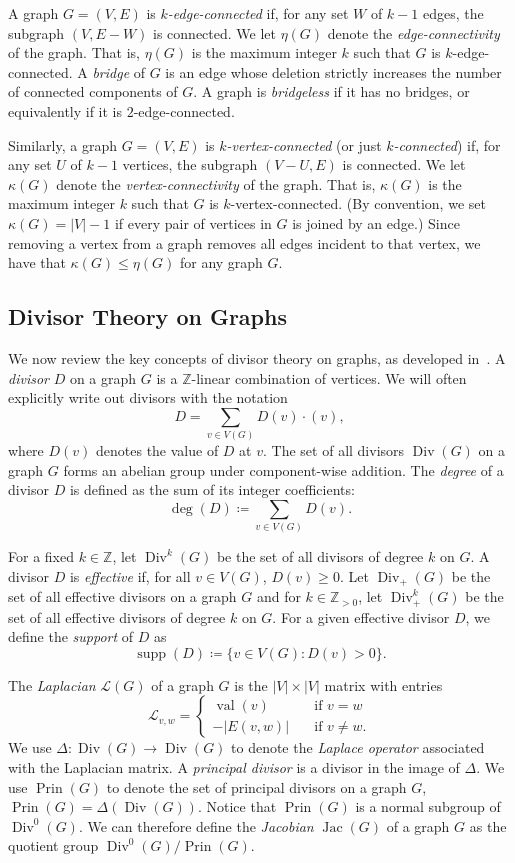\documentclass[ALCO,ThmDefs,Unicode,epreuves]{cedram}
\DeclareMathOperator{\val}{val}
\DeclareMathOperator{\Div}{Div}
\DeclareMathOperator{\supp}{supp}
\DeclareMathOperator{\Prin}{Prin}
\DeclareMathOperator{\Jac}{Jac}
\begin{document}
A graph $G = (V, E)$ is \emph{$k$-edge-connected} if, for any set $W$ of $k-1$ edges, the subgraph $(V,E-W)$ is connected. We let $\eta(G)$ denote the \emph{edge-connectivity} of the graph. That is, $\eta(G)$ is the maximum integer $k$ such that $G$ is $k$-edge-connected. A \emph{bridge} of $G$ is an edge whose deletion strictly increases the number of connected components of $G$. A graph is \emph{bridgeless} if it has no bridges, or equivalently if it is $2$-edge-connected.

Similarly, a graph $G = (V, E)$ is \emph{$k$-vertex-connected} (or just \emph{$k$-connected}) if, for any set $U$ of $k-1$ vertices, the subgraph $(V-U,E)$ is connected. We let $\kappa(G)$ denote the \emph{vertex-connectivity} of the graph. That is, $\kappa(G)$ is the maximum integer $k$ such that $G$ is $k$-vertex-connected. (By convention, we set $\kappa(G)=|V|-1$ if every pair of vertices in $G$ is joined by an edge.) Since removing a vertex from a graph removes all edges incident to that vertex, we have that $\kappa(G)\leq \eta(G)$ for any graph $G$.

\subsection{Divisor Theory on Graphs}

We now review the key concepts of divisor theory on graphs, as developed in~\cite{baker}. A \emph{divisor} $D$ on a graph $G$ is a $\mathbb{Z}$-linear combination of vertices. We will often explicitly write out divisors with the notation
\[
D = \sum_{v \in V(G)} D(v) \cdot (v),
\]
where $D(v)$ denotes the value of $D$ at $v$.
The set of all divisors $\Div (G)$ on a graph $G$ forms an abelian group under component-wise addition. The \emph{degree} of a divisor $D$ is defined as the sum of its integer coefficients:
\[
\deg (D) \coloneqq \sum_{v \in V(G)} D(v).
\]

For a fixed $k \in \mathbb{Z}$, let $\Div ^k(G)$ be the set of all divisors of degree $k$ on $G$. A divisor $D$ is \emph{effective} if, for all $v \in V(G)$, $D(v) \geq 0$. Let $\Div _+(G)$ be the set of all effective divisors on a graph $G$ and for $k \in \mathbb{Z}_{>0}$, let $\Div _+^k(G)$ be the set of all effective divisors of degree $k$ on $G$. For a given effective divisor $D$, we define the \emph{support} of $D$ as
\[
\supp (D) \coloneqq \{ v \in V(G) : D(v) > 0 \}.
\]

The \emph{Laplacian} $\mathcal{L}(G)$ of a graph $G$ is the $|V|\times |V|$ matrix with entries
\[
\mathcal{L}_{v,w} = 
\begin{cases}
\val (v) \quad &\text{if $v = w$} \\
-| E(v, w) | \quad &\text{if $v \neq w$}.
\end{cases}
\]
We use $\Delta : \Div (G) \to \Div (G)$ to denote the \emph{Laplace operator} associated with the Laplacian matrix. A \emph{principal divisor} is a divisor in the image of $\Delta$. We use $\Prin (G)$ to denote the set of principal divisors on a graph $G$, \ie $\Prin (G) = \Delta(\Div (G))$. Notice that $\Prin (G)$ is a normal subgroup of $\Div ^0(G)$. We can therefore define the \emph{Jacobian} $\Jac (G)$ of a graph $G$ as the quotient group $\Div ^0(G) / \Prin (G)$.
\end{document}
